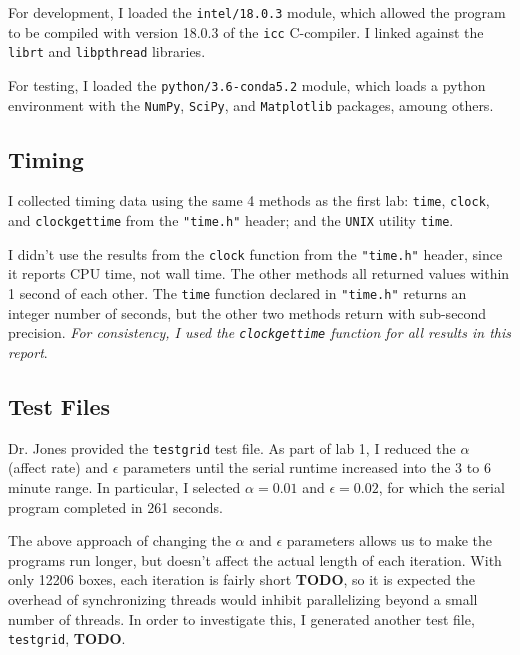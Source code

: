 \documentclass{article}
\begin{document}
For development, I loaded the \texttt{intel/18.0.3} module, which allowed the
program to be compiled with version 18.0.3 of the \texttt{icc} C-compiler. I
linked against the \texttt{librt} and \texttt{libpthread} libraries.

For testing, I loaded the \texttt{python/3.6-conda5.2} module, which loads a
python environment with the \texttt{NumPy}, \texttt{SciPy}, and
\texttt{Matplotlib} packages, amoung others.

\subsection*{Timing}
\label{subsec:timing}

I collected timing data using the same 4 methods as the first lab:
\texttt{time}, \texttt{clock}, and \texttt{clock\textunderscore gettime} from
the \texttt{"time.h"} header; and the \texttt{UNIX} utility \texttt{time}.

I didn't use the results from the \texttt{clock} function from the
\texttt{"time.h"} header, since it reports CPU time, not wall time. The other
methods all returned values within 1 second of each other. The \texttt{time}
function declared in \texttt{"time.h"} returns an integer number of seconds,
but the other two methods return with sub-second precision.  \emph{For
consistency, I used the \texttt{clock\textunderscore gettime} function for all
results in this report}.

\subsection*{Test Files}
\label{subsec:test_files}

Dr. Jones provided the \texttt{testgrid} test file.
As part of lab 1, I reduced the $\alpha$ (affect rate) and $\epsilon$ parameters until the
serial runtime increased into the 3 to 6 minute range. In particular, I selected $\alpha = 0.01$ and $\epsilon = 0.02$,
for which the serial program completed in 261 seconds.

The above approach of changing the $\alpha$ and $\epsilon$ parameters allows us
to make the programs run longer, but doesn't affect the actual length of each
iteration. With only 12206 boxes, each iteration is fairly short \textbf{TODO},
so it is expected the overhead of synchronizing threads would inhibit
parallelizing beyond a small number of threads. In order to investigate this,
I generated another test file, \texttt{testgrid}, \textbf{TODO}.
\end{document}
